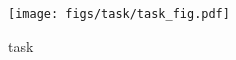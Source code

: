 \begin{figure}[tb]
  \centering
  \texttt{[image: figs/task/task\_fig.pdf]}
  \caption{task}
  \label{fig:task}
\end{figure}
